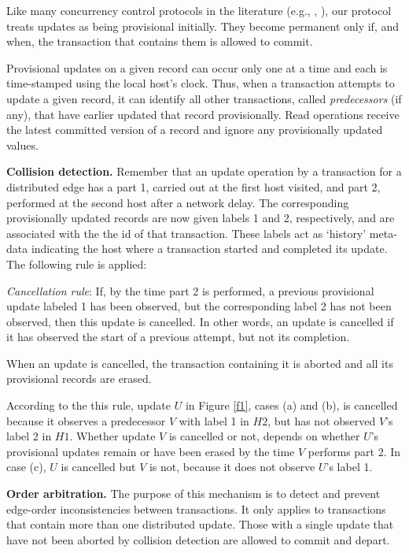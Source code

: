 \documentclass[runningheads]{llncs}
\begin{document}
Like many concurrency control protocols in the literature (e.g., \cite{occ},
\cite{warp}), our protocol treats updates as being provisional initially.
They become permanent only if, and when, the transaction that contains them
is allowed to commit.

Provisional updates on a given record can occur only one at a time and each is
time-stamped using the local host's clock. Thus, when a transaction attempts to
update a given record, it can identify all other transactions, called
{\em predecessors} (if any), that have earlier updated that record provisionally.
Read operations receive the latest committed version of a record and ignore any
provisionally updated values.

{\bf Collision detection.} Remember that an update operation by a transaction for
a distributed edge has a part 1, carried out at the first host visited, and part 2,
performed at the second host after a network delay. The corresponding provisionally
updated records are now given labels 1 and 2, respectively, and are associated with
the the id of that transaction. These labels act as `history' meta-data indicating
the host where a transaction started and completed its update. The following rule
is applied:

{\em Cancellation rule}: If, by the time part 2 is performed, a previous
provisional update labeled 1 has been observed, but the corresponding label 2 has
not been observed, then this update is cancelled. In other words, an update is
cancelled if it has observed the start of a previous attempt, but not its completion.

When an update is cancelled, the transaction containing it is aborted and all its
provisional records are erased.

According to the this rule, update $U$ in Figure \ref{f1}, cases (a) and (b), is
cancelled because it observes a predecessor $V$ with label 1 in $H2$, but has not
observed $V$'s label 2 in $H1$. Whether update $V$ is cancelled or not, depends on
whether $U$'s provisional updates remain or have been erased by the time $V$ performs
part 2. In case (c), $U$ is cancelled but $V$ is not, because it does not observe
$U$'s label 1.

{\bf Order arbitration.} The purpose of this mechanism is to detect and prevent
edge-order inconsistencies between transactions. It only applies to transactions
that contain more than one distributed update. Those with a single update that
have not been aborted by collision detection are allowed to commit and depart.
\end{document}
